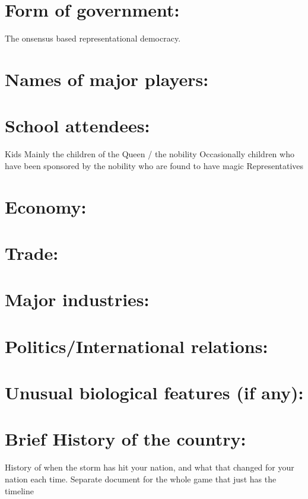 \documentclass[blue]{GL2020}
\begin{document}
\name{\bVikings{}}

\section{Form of government:} The \pVikings{} onsensus based representational democracy.

\section{Names of major players:}

\section{School attendees:}

Kids
Mainly the children of the Queen / the nobility
Occasionally children who have been sponsored by the nobility who are found to have magic
Representatives

\section{Economy:}

\section{Trade:}

\section{Major industries:}

\section{Politics/International relations:}

\section{Unusual biological features (if any):}

\section{Brief History of the country:}

History of when the storm has hit your nation, and what that changed for your nation each time.
Separate document for the whole game that just has the timeline
\end{document}
